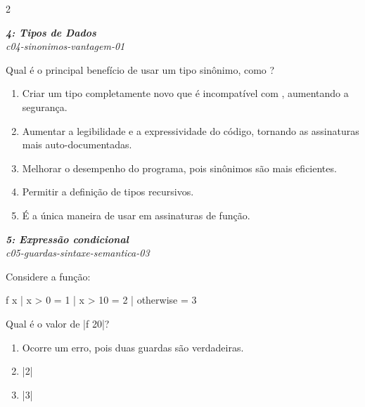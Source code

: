 \documentclass[a4paper,10pt,brazil]{article}
\begin{document}
\begin{multicols}{2}
\begin{enumerate}
\end{enumerate}

\begin{flushright}
  \footnotesize
  \textit{\textbf{4: Tipos de Dados}}\\
  \textit{c04-sinonimos-vantagem-01}\\

\end{flushright}
Qual é o principal benefício de usar um tipo sinônimo, como ?

\begin{enumerate}
  \item Criar um tipo completamente novo que é incompatível com , aumentando a segurança.

  \item Aumentar a legibilidade e a expressividade do código, tornando as assinaturas mais auto-documentadas.

  \item Melhorar o desempenho do programa, pois sinônimos são mais eficientes.

  \item Permitir a definição de tipos recursivos.

  \item É a única maneira de usar  em assinaturas de função.


\end{enumerate}

\begin{flushright}
  \footnotesize
  \textit{\textbf{5: Expressão condicional}}\\
  \textit{c05-guardas-sintaxe-semantica-03}\\

\end{flushright}
Considere a função:
\begin{haskellcode}
f x
  | x > 0     = 1
  | x > 10    = 2
  | otherwise = 3
\end{haskellcode}
Qual é o valor de \haskellinline|f 20|?

\begin{enumerate}
  \item Ocorre um erro, pois duas guardas são verdadeiras.

  \item \haskellinline|2|

  \item \haskellinline|3|


\end{enumerate}
\end{multicols}
\end{document}
